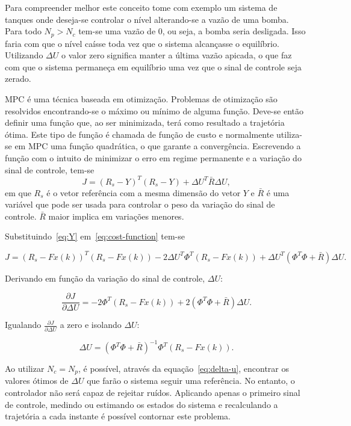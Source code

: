Para compreender melhor este conceito tome com exemplo um sistema de tanques
onde deseja-se controlar o nível alterando-se a vazão de uma bomba. Para todo
\( N_p > N_c \) tem-se uma vazão de 0, ou seja, a bomba seria desligada. Isso
faria com que o nível caísse toda vez que o sistema alcançasse o equilíbrio.
Utilizando \( \Delta{}U \) o valor zero significa manter a última vazão apicada,
o que faz com que o sistema permaneça em equilíbrio uma vez que o sinal de
controle seja zerado.

MPC é uma técnica baseada em otimização. Problemas de otimização são resolvidos
encontrando-se o máximo ou mínimo de alguma função. Deve-se então definir uma
função que, ao ser minimizada, terá como resultado a trajetória ótima. Este tipo
de função é chamada de função de custo e normalmente utiliza-se em \ac{MPC} uma
função quadrática, o que garante a convergência. Escrevendo a função com o
intuito de minimizar o erro em regime permanente e a variação do sinal de
controle, tem-se
%
\begin{equation}
	\label{eq:cost-function}
	J = {(R_s - Y)}^T(R_s-Y) + \Delta{}U^T\bar{R}\Delta{}U,
\end{equation}
%
em que \( R_s \) é o vetor referência com a mesma dimensão do vetor \( Y \) e
\(\bar{R} \) é uma variável que pode ser usada para controlar o peso da variação
do sinal de controle. \( \bar{R} \) maior implica em variações menores.

Substituindo~\eqref{eq:Y} em~\eqref{eq:cost-function} tem-se

\begin{equation}
	J = {(R_s-Fx(k))}^T(R_s-Fx(k))-2\Delta{}U^T\Phi^T(R_s-Fx(k))+\Delta{}U^T(\Phi^T\Phi+\bar{R})\Delta{}U.
\end{equation}

Derivando em função da variação do sinal de controle, \( \Delta{}U \):

\begin{equation}
	\frac{\partial{}J}{\partial{}\Delta{}U} = -2\Phi^T(R_s-Fx(k))+2(\Phi^T\Phi+\bar{R})\Delta{}U.
\end{equation}

Igualando \( \frac{\partial{}J}{\partial{}\Delta{}U} \) a zero e isolando \(
\Delta{}U \):

\begin{equation}
	\label{eq:delta-u}
	\Delta{}U = {(\Phi^T\Phi+\bar{R})}^{-1}\Phi^T(R_s-Fx(k)).
\end{equation}

Ao utilizar \( N_c = N_p \), é possível, através da equação~\eqref{eq:delta-u},
encontrar os valores ótimos de \( \Delta{}U \) que farão o sistema seguir uma
referência. No entanto, o controlador não será capaz de rejeitar ruídos.
Aplicando apenas o primeiro sinal de controle, medindo ou estimando os estados
do sistema e recalculando a trajetória a cada instante é possível contornar este
problema.

